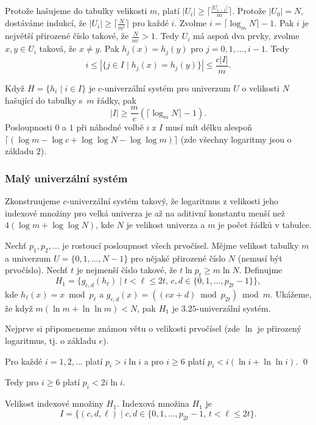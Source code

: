 \documentclass[a4paper,12pt]{article}
\begin{document}
Protože hašujeme do tabulky velikosti $m$, platí 
$|U_i|\ge\lceil\frac {|U_{i-1}|}m\rceil$. Protože $|U_0|=N$, dostáváme indukcí, že 
$|U_i|\ge\lceil\frac N{m^i}\rceil$ pro každé $i$. Zvolme $i=
\lceil\log_mN\rceil -1$. Pak $i$ je 
největší přirozené číslo takové, že $\frac 
N{m^i}>1$. Tedy $U_i$ má 
aspoň dva prvky, zvolme $x,y\in U_i$ taková, že $x\ne y$. Pak 
$h_j(x)=h_j(y)$ pro $j=0,1,\dots,i-1$. Tedy 
$$i\le |\{j\in I\mid h_j(x)=h_j(y)\}|\le\frac {c|I|}m.$$

\begin{veta}Když $H=\{h_i\mid i\in I\}$ je $c$-univerzální systém pro 
univerzum $U$ o velikosti $N$ hašující do tabulky s~$m$ řádky, pak 
$$|I|\ge\frac mc(\lceil\log_mN\rceil -1).$$
Posloupnosti $0$ a $1$ při náhodné volbě $i$ z $I$ musí mít 
délku alespoň $\lceil (\log m-\log c+\log\log N-\log\log m)\rceil$ (zde všechny logaritmy 
jsou o základu $2$).
\end{veta}

\subsubsection{Malý univerzální systém}

Zkonstruujeme $c$-univerzální systém takový, 
že logaritmus z velikosti jeho indexové množiny pro velká 
univerza je až na aditivní konstantu menší než 
$4(\log m+\log\log N)$, kde $N$ je velikost univerza a $m$ je počet 
řádků v tabulce.  

Nechť $p_1,p_2,\dots$ je rostoucí posloupnost všech 
prvočísel. Měj\-me velikost tabulky $m$ a univerzum $U=
\{0,1,\dots,N-1\}$ pro 
nějaké přirozené číslo $N$ (nemusí být prvočíslo). Nechť $
t$ je 
nejmenší číslo takové, že $t\ln p_t\ge m\ln N$. Definujme 
$$H_1=\{g_{c,d}(h_{\ell})\mid t<\ell\le 2t,\,c,d\in \{0,1,\dots,p_{
2t}-1\}\},$$
kde $h_{\ell}(x)=x\bmod p_{\ell}$ a 
$g_{c,d}(x)=((cx+d)\bmod p_{2t})\bmod m$.\newline 
Ukážeme, že když $m(\ln m+\ln\ln m)<N$, pak $H_1$ je $
3.25$-univerzální systém. 

Nejprve si připomeneme známou větu o velikosti prvočísel 
(zde $\ln$ je přirozený logaritmus, tj. o základu $e$).

\begin{veta}Pro každé $i=1,2,\dots$ platí $p_i>i\ln 
i$ a pro $i\ge 6$ 
platí $p_i<i(\ln i+\ln\ln i)$. \qed
\end{veta}

Tedy pro $i\ge 6$ platí $p_i<2i\ln i$.

Velikost indexové množiny $H_1$.  Indexová množina $
H_1$ je 
$$I=\{(c,d,\ell )\mid c,d\in \{0,1,\dots,p_{2t}-1,\,t<\ell\le 2t\}
.$$
  
\end{document}
